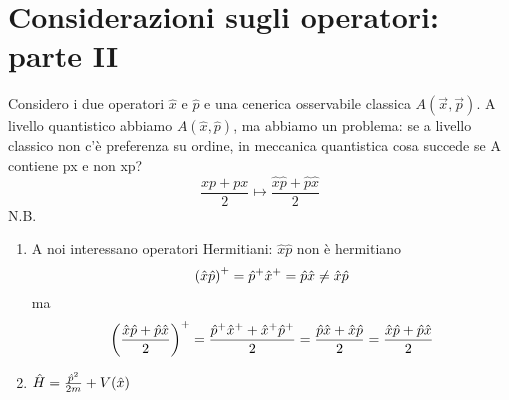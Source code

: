 \chapter{Considerazioni sugli operatori: parte II}

Considero i due operatori $\hat{x}$ e $\hat{p}$ e una cenerica osservabile classica $A(\vec{x},\vec{p})$. A livello quantistico abbiamo $A(\hat{x},\hat{p})$, ma abbiamo un problema: se a livello classico non c'è preferenza su ordine, in meccanica quantistica cosa succede se A contiene px e non xp?
\begin{equation*}
    \frac{xp + px}{2} \mapsto \frac{\hat{x}\hat{p} + \hat{p}\hat{x}}{2}
\end{equation*}
N.B.
\begin{enumerate}
    \item A noi interessano operatori Hermitiani: $\hat{x}\hat{p}$ non è hermitiano
    \begin{equation*}
        {(\hat{x}\hat{p})}^+ = \hat{p}^+\hat{x}^+ = \hat{p}\hat{x} \neq \hat{x}\hat{p} 
    \end{equation*}
    ma 
    \begin{equation*}
        {\left(\frac{\hat{x}\hat{p} + \hat{p}\hat{x}}{2}\right)}^+ = \frac{\hat{p}^+\hat{x}^+ + \hat{x}^+\hat{p}^+}{2} = \frac{\hat{p}\hat{x} + \hat{x}\hat{p}}{2} = \frac{\hat{x}\hat{p} + \hat{p}\hat{x}}{2}
    \end{equation*}
    \item $\hat{H} = \frac{\hat{p}^2}{2m} + V(\hat{x})$
\end{enumerate}

